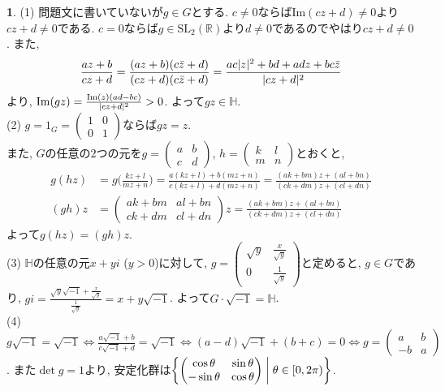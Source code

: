 \documentclass{article}
\theoremstyle{definition}
\newtheorem{ans}{}
\numberwithin{ans}{subsection}
\DeclarePairedDelimiter{\abs}{\lvert}{\rvert}
\begin{document}
\begin{ans}
  (1) 問題文に書いていないが$g \in G$とする.
  $c \neq 0$ならば$\mathrm{Im}(cz + d) \neq 0$より$cz + d \neq 0$である.
  $c = 0$ならば$g \in \mathrm{SL}_2(\mathbb{R})$より$d \neq 0$であるのでやはり$cz + d \neq 0$.
  また,
  \begin{align*}
    \frac{az + b}{cz + d}
    = \frac{(az + b)(c\bar{z} + d)}{(cz + d)(c\bar{z} + d)}
    = \frac{ac\abs{z}^2 + bd + adz + bc\bar{z}}{\abs{cz + d}^2}
  \end{align*}
  より, $\mathrm{Im}(gz) = \frac{\mathrm{Im}(z)(ad - bc)}{\abs{cz + d}^2} > 0$.
  よって$gz \in \mathbb{H}$.\\
  (2) $g = 1_G = \begin{pmatrix*}
    1 & 0 \\
    0 & 1
  \end{pmatrix*}$ならば$gz = z$.\\
  また, $G$の任意の$2$つの元を$g = \begin{pmatrix*}
    a & b \\
    c & d
  \end{pmatrix*}$, $h = \begin{pmatrix*}
    k & l \\
    m & n
  \end{pmatrix*}$とおくと,
  \begin{align*}
    g(hz) &= g\biggl(\frac{kz + l}{mz + n}\biggr)
    = \frac{a(kz + l) + b(mz + n)}{c(kz + l) + d(mz + n)}
    = \frac{(ak + bm)z + (al + bn)}{(ck + dm)z + (cl + dn)}\\
    (gh)z &= \begin{pmatrix*}
      ak + bm & al + bn \\
      ck + dm & cl + dn
    \end{pmatrix*}z = \frac{(ak + bm)z + (al + bn)}{(ck + dm)z + (cl + dn)}
  \end{align*}
  よって$g(hz) = (gh)z$.\\
  (3) $\mathbb{H}$の任意の元$x + yi$ ($y > 0$)に対して,
  $g = \begin{pmatrix*}
    \sqrt{y} & \frac{x}{\sqrt{y}} \\
    0 & \frac{1}{\sqrt{y}}
  \end{pmatrix*}$と定めると, $g \in G$であり,
  $gi = \frac{\sqrt{y} \sqrt{-1} + \frac{x}{\sqrt{y}}}{\frac{1}{\sqrt{y}}} = x + y\sqrt{-1}$.
  よって$G \cdot \sqrt{-1} = \mathbb{H}$.\\
  (4) $g \sqrt{-1} = \sqrt{-1}
  \Leftrightarrow \frac{a\sqrt{-1} + b}{c\sqrt{-1} + d} = \sqrt{-1}
  \Leftrightarrow (a - d)\sqrt{-1} + (b + c) = 0
  \Leftrightarrow g = \begin{pmatrix*}
    a & b \\
    -b & a
  \end{pmatrix*}$.
  また$\det g = 1$より, 安定化群は$\biggl\{\begin{pmatrix*}
    \cos\theta & \sin\theta \\
    -\sin\theta & \cos\theta
  \end{pmatrix*} \biggm\vert \theta \in [0, 2\pi) \biggr\}$.
\end{ans}
\end{document}
